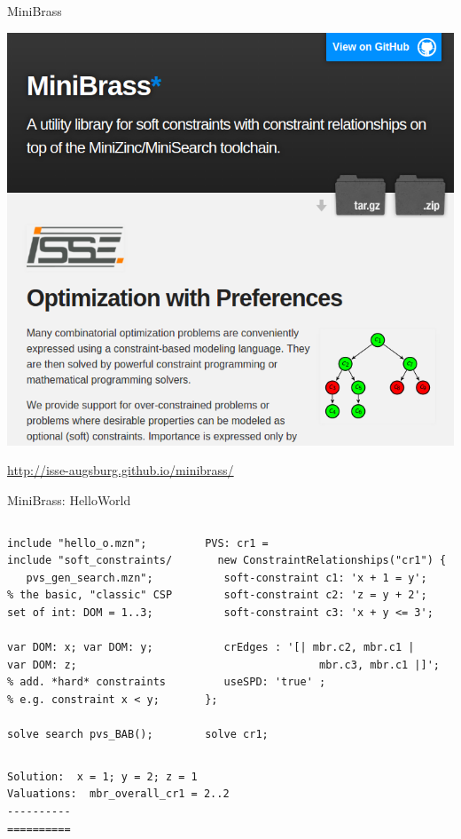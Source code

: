 
\begin{frame}[fragile]{MiniBrass}

\begin{center}

\includegraphics[width=.5\textwidth]{img/minibrass.png}

\vspace*{2ex}

\url{http://isse-augsburg.github.io/minibrass/}

\end{center}

\end{frame}

\begin{frame}[fragile]{MiniBrass: HelloWorld}
\begin{columns}[onlytextwidth,T]
    
    \begin{column}{.40\textwidth}
          
    \begin{lstlisting}
include "hello_o.mzn"; 
include "soft_constraints/
   pvs_gen_search.mzn"; 
% the basic, "classic" CSP 
set of int: DOM = 1..3;

var DOM: x; var DOM: y; 
var DOM: z;
% add. *hard* constraints
% e.g. constraint x < y;

solve search pvs_BAB();
\end{lstlisting}
    \end{column}
    
    \begin{column}{.55\textwidth}
  	\begin{lstlisting}
PVS: cr1 = 
  new ConstraintRelationships("cr1") {
   soft-constraint c1: 'x + 1 = y';
   soft-constraint c2: 'z = y + 2';
   soft-constraint c3: 'x + y <= 3';
   
   crEdges : '[| mbr.c2, mbr.c1 | 
                  mbr.c3, mbr.c1 |]';
   useSPD: 'true' ;
}; 

solve cr1;
\end{lstlisting}

    \end{column}
  \end{columns}
  \pause
  \begin{verbatim}
Solution:  x = 1; y = 2; z = 1
Valuations:  mbr_overall_cr1 = 2..2
----------
==========
  \end{verbatim}
\end{frame}


